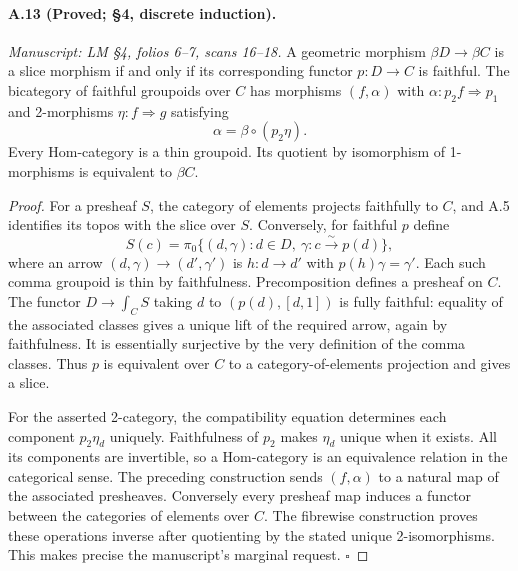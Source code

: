 \paragraph{A.13 (Proved; \S4, discrete induction).}
\textit{Manuscript: LM \S4, folios 6--7, scans 16--18.}
A geometric morphism $\beta D\to\beta C$ is a slice morphism if and only if its corresponding functor $p:D\to C$ is faithful. The bicategory of faithful groupoids over $C$ has morphisms $(f,\alpha)$ with $\alpha:p_2f\Rightarrow p_1$ and 2-morphisms $\eta:f\Rightarrow g$ satisfying
\[
 \alpha=\beta\circ(p_2\eta).
\]
Every Hom-category is a thin groupoid. Its quotient by isomorphism of 1-morphisms is equivalent to $\beta C$.
\begin{proof}
For a presheaf $S$, the category of elements projects faithfully to $C$, and A.5 identifies its topos with the slice over $S$. Conversely, for faithful $p$ define
\[
 S(c)=\pi_0\{(d,\gamma):d\in D,\ \gamma:c\xrightarrow{\sim}p(d)\},
\]
where an arrow $(d,\gamma)\to(d',\gamma')$ is $h:d\to d'$ with $p(h)\gamma=\gamma'$. Each such comma groupoid is thin by faithfulness. Precomposition defines a presheaf on $C$. The functor $D\to\int_C S$ taking $d$ to $(p(d),[d,1])$ is fully faithful: equality of the associated classes gives a unique lift of the required arrow, again by faithfulness. It is essentially surjective by the very definition of the comma classes. Thus $p$ is equivalent over $C$ to a category-of-elements projection and gives a slice.

For the asserted 2-category, the compatibility equation determines each component $p_2\eta_d$ uniquely. Faithfulness of $p_2$ makes $\eta_d$ unique when it exists. All its components are invertible, so a Hom-category is an equivalence relation in the categorical sense. The preceding construction sends $(f,\alpha)$ to a natural map of the associated presheaves. Conversely every presheaf map induces a functor between the categories of elements over $C$. The fibrewise construction proves these operations inverse after quotienting by the stated unique 2-isomorphisms. This makes precise the manuscript's marginal request. \hfill$\square$
\end{proof}

